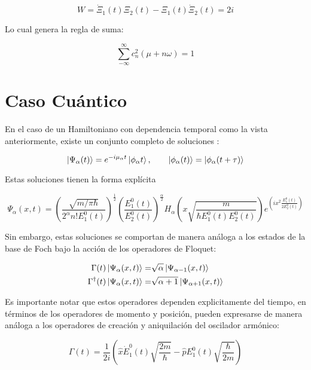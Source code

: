 \documentclass[a4paper,10pt]{report}
\begin{document}
\begin{equation}
W = \dot{\Xi}_1(t)\Xi_2(t)-\Xi_1(t)\dot{\Xi}_2(t) = 2i
\end{equation}

Lo cual genera la regla de suma:

\begin{equation}
\sum_{-\infty}^\infty c_n^2(\mu + n\omega) = 1
\end{equation}

\section{Caso Cuántico}

En el caso de un Hamiltoniano con dependencia temporal como la vista anteriormente, existe un conjunto completo de soluciones \cite{BarnettSD}:

\begin{equation}
\Ket{\Psi_\alpha (t)} = e^{-i\mu_\alpha t}\Ket{\phi_\alpha t}, \qquad \Ket{\phi_\alpha (t)}=\Ket{\phi_\alpha (t+\tau)}
\end{equation}

Estas soluciones tienen la forma explícita\cite{BrownPT}

\begin{equation}
\Psi_\alpha (x,t) = (\frac{\sqrt{m/\pi\hbar}}{2^\alpha n!E_1^0(t)})^{\frac{1}{2}}(\frac{E_1^0(t)}{E_2^0(t)})^\frac{\alpha}{2}H_\alpha(x\sqrt{\frac{m}{\hbar E_1^0(t) E_2^0(t)}})e^{(ix^2\frac{E_1^0(t)}{2E_2^0(t)})}
\end{equation}

Sin embargo, estas soluciones se comportan de manera análoga a los estados de la base de Foch bajo la acción de los operadores de Floquet:

\begin{align*}\label{FloquetOperators}
\Gamma(t) \Ket{\Psi_\alpha (x,t)} =& \sqrt{\alpha}\Ket{\Psi_{\alpha-1} (x,t)} \\
\Gamma^\dagger(t) \Ket{\Psi_\alpha (x,t)} =& \sqrt{\alpha+1}\Ket{\Psi_{\alpha+1} (x,t)}
\end{align*}

Es importante notar que estos operadores dependen explicitamente del tiempo, en términos de los operadores de momento y posición, pueden expresarse de manera análoga a los operadores de creación y aniquilación del oscilador armónico:

\begin{equation}
\Gamma(t) = \frac{1}{2i}(\hat{x}\dot{E}_1^0(t)\sqrt{\frac{2m}{\hbar}}-\hat{p}E_1^0(t)\sqrt{\frac{\hbar}{2m}})
\end{equation}
\end{document}
